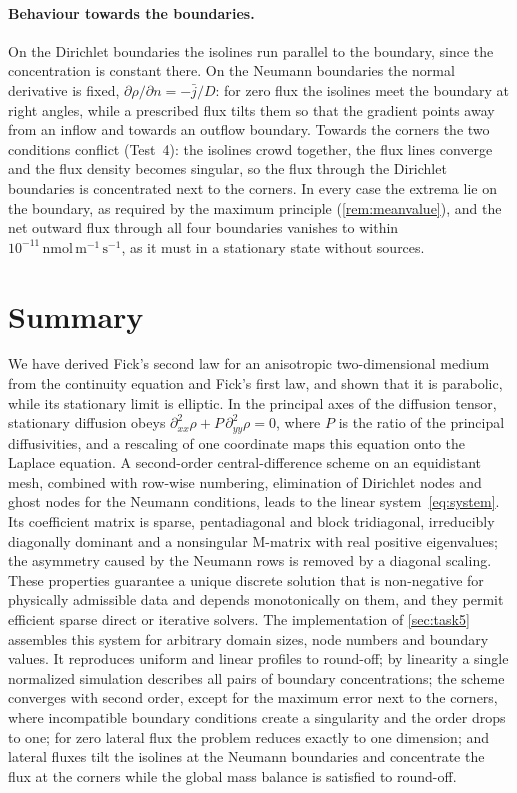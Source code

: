 \documentclass[11pt,a4paper]{article}
\numberwithin{equation}{section}
\theoremstyle{definition}
\theoremstyle{remark}
\begin{document}
\paragraph{Behaviour towards the boundaries.} On the Dirichlet boundaries the isolines run parallel to
the boundary, since the concentration is constant there. On the Neumann boundaries the normal
derivative is fixed, $\partial\rho/\partial n = -\bar j/D$: for zero flux the isolines meet the
boundary at right angles, while a prescribed flux tilts them so that the gradient points away from an
inflow and towards an outflow boundary. Towards the corners the two conditions conflict (Test~4): the
isolines crowd together, the flux lines converge and the flux density becomes singular, so the flux
through the Dirichlet boundaries is concentrated next to the corners. In every case the extrema lie on
the boundary, as required by the maximum principle (\cref{rem:meanvalue}), and the net outward flux
through all four boundaries vanishes to within $10^{-11}\,\mathrm{nmol\,m^{-1}\,s^{-1}}$, as it must
in a stationary state without sources.

\section{Summary}\label{sec:summary}

We have derived Fick's second law for an anisotropic two-dimensional medium from the
continuity equation and Fick's first law, and shown that it is parabolic, while its
stationary limit is elliptic. In the principal axes of the diffusion tensor, stationary
diffusion obeys $\partial^2_{xx}\rho + P\,\partial^2_{yy}\rho = 0$, where $P$ is the ratio
of the principal diffusivities, and a rescaling of one coordinate maps this equation onto
the Laplace equation. A second-order central-difference scheme on an equidistant mesh,
combined with row-wise numbering, elimination of Dirichlet nodes and ghost nodes for the
Neumann conditions, leads to the linear system~\eqref{eq:system}. Its coefficient matrix
is sparse, pentadiagonal and block tridiagonal, irreducibly diagonally dominant and a
nonsingular M-matrix with real positive eigenvalues; the asymmetry caused by the Neumann
rows is removed by a diagonal scaling. These properties guarantee a unique discrete
solution that is non-negative for physically admissible data and depends monotonically on
them, and they permit efficient sparse direct or iterative solvers. The implementation of
\cref{sec:task5} assembles this system for arbitrary domain sizes, node numbers and boundary values.
It reproduces uniform and linear profiles to round-off; by linearity a single normalized simulation
describes all pairs of boundary concentrations; the scheme converges with second order, except for the
maximum error next to the corners, where incompatible boundary conditions create a singularity and the
order drops to one; for zero lateral flux the problem reduces exactly to one dimension; and lateral
fluxes tilt the isolines at the Neumann boundaries and concentrate the flux at the corners while the
global mass balance is satisfied to round-off.
\end{document}
